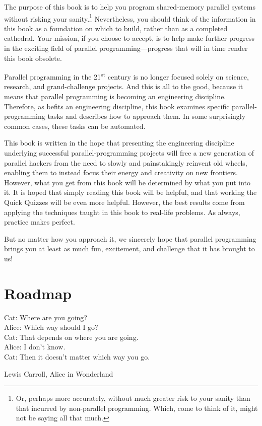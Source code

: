 
%

The purpose of this book is to help you program
shared-memory parallel systems without risking your sanity.\footnote{
	Or, perhaps more accurately, without much greater risk to your
	sanity than that incurred by non-parallel programming.
	Which, come to think of it, might not be saying all that much.}
Nevertheless, you should think of the information in this book as a
foundation on which to build, rather than as a completed cathedral.
Your mission, if you choose to accept, is to help make further progress
in the exciting field of parallel programming---progress that will
in time render this book obsolete.

Parallel programming in the 21\textsuperscript{st} century is no longer
focused solely on science, research, and grand-challenge projects.
And this is all to the good, because it means that parallel programming
is becoming an engineering discipline.
Therefore, as befits an engineering discipline, this book examines
specific parallel-programming tasks and describes how to approach them.
In some surprisingly common cases, these tasks can be automated.

This book is written in the hope that presenting the engineering
discipline underlying successful
parallel-programming projects will free a new generation of parallel hackers
from the need to slowly and painstakingly reinvent old wheels, enabling
them to instead focus their energy and creativity on new frontiers.
However, what you get from this book will be determined by what you
put into it.
It is hoped that simply reading this book will be helpful,
and that working the Quick Quizzes will be even more helpful.
However, the best results come from applying the techniques taught
in this book to real-life problems.
As always, practice makes perfect.

But no matter how you approach it, we sincerely hope that parallel
programming brings you at least as much fun, excitement, and challenge
that it has brought to us!

\section{Roadmap}
\label{sec:howto:Roadmap}
%
\epigraph{Cat:
		Where are you going? \\
	  Alice:
		Which way should I go? \\
	  Cat:
		That depends on where you are going. \\
	  Alice:
		I don't know. \\
	  Cat:
		Then it doesn't matter which way you go.}
	 {Lewis Carroll, Alice in Wonderland}

